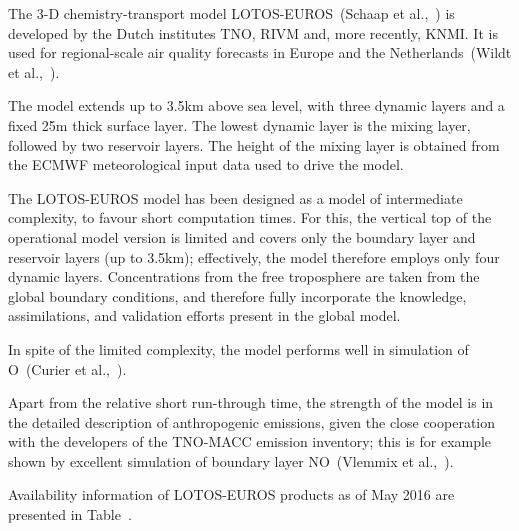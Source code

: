 \documentclass[9pt]{report}
\begin{document}
\noindent{}The 3-D chemistry-transport model LOTOS-EUROS~(Schaap et al.,~) is developed by the Dutch institutes TNO, RIVM and, more recently, KNMI.
It is used for regional-scale air quality forecasts in Europe and the Netherlands~(Wildt et al.,~).%

The model extends up to 3.5km above sea level, with three dynamic layers and a ﬁxed 25m thick surface layer. 
The lowest dynamic layer is the mixing layer, followed by two reservoir layers. 
The height of the mixing layer is obtained from the ECMWF meteorological input data used to drive the model.%

The LOTOS-EUROS model has been designed as a model of intermediate complexity, to favour short computation times. 
For this, the vertical top of the operational model version is limited and covers only the boundary layer and reservoir layers (up to 3.5km); effectively, the model therefore employs only four dynamic layers. 
Concentrations from the free troposphere are taken from the global boundary conditions, and therefore fully incorporate the knowledge, assimilations, and validation efforts present in the global model.%

In spite of the limited complexity, the model performs well in simulation of O~(Curier et al.,~).%

Apart from the relative short run-through time, the strength of the model is in the detailed description of anthropogenic emissions, given the close cooperation with the developers of the TNO-MACC emission inventory; this is for example shown by excellent simulation of boundary layer NO~(Vlemmix et al.,~).%

Availability information of LOTOS-EUROS products as of May 2016 are presented in Table~.%
\end{document}
